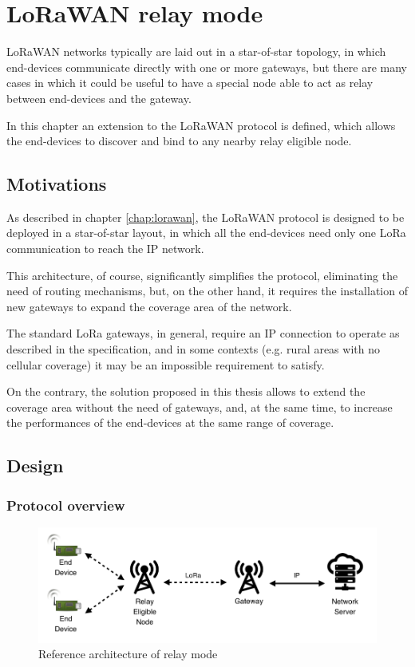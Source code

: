 \chapter{LoRaWAN relay mode}
\label{chap:relayproto}

LoRaWAN networks typically are laid out in a star-of-star topology, in which end-devices communicate directly with one or more gateways, but there are many cases in which it could be useful to have a special node able to act as relay between end-devices and the gateway.

In this chapter an extension to the LoRaWAN protocol is defined, which allows the end-devices to discover and bind to any nearby relay eligible node.


\section{Motivations}

As described in chapter \ref{chap:lorawan}, the LoRaWAN protocol is designed to be deployed in a star-of-star layout, in which all the end-devices need only one LoRa communication to reach the IP network.

This architecture, of course, significantly simplifies the protocol, eliminating the need of routing mechanisms, but, on the other hand, it requires the installation of new gateways to expand the coverage area of the network.

The standard LoRa gateways, in general, require an IP connection to operate as described in the specification, and in some contexts (e.g. rural areas with no cellular coverage) it may be an impossible requirement to satisfy.

On the contrary, the solution proposed in this thesis allows to extend the coverage area without the need of gateways, and, at the same time, to increase the performances of the end-devices at the same range of coverage.


\section{Design}
\label{sec:protdesign}

\subsection{Protocol overview}

\begin{figure}
\centering
\includegraphics[width=\textwidth]{img/relay-architecture}
\caption{Reference architecture of relay mode}
\label{fig:relayarch}
\end{figure}

